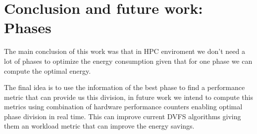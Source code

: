 %

\section{Conclusion and future work: Phases}
The main conclusion of this work was that in HPC enviroment we don't need a lot of phases to optimize the energy consumption given that for one phase we can compute the optimal energy.

The final idea is to use the information of the best phase to find a performance metric that can provide us this division, in future work we intend to compute this metrics using combination of hardware performance counters enabling optimal phase division in real time. This can improve current DVFS algorithms giving them an workload metric that can improve the energy savings.
